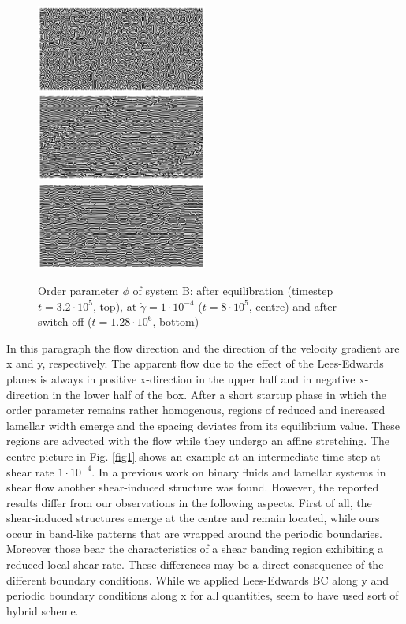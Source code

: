 \documentclass[8.5pt,twoside,twocolumn]{article}
\newcommand{\e}[1]{\cdot10^{#1}}
\begin{document}
\begin{figure}[htp!]
\centering
\includegraphics[angle=0,width=0.5\textwidth]{phi_run707_320.jpg}\\
\includegraphics[angle=0,width=0.5\textwidth]{phi_run710_800.jpg}\\
\includegraphics[angle=0,width=0.5\textwidth]{phi_run765_1280.jpg}
\caption{Order parameter $\phi$ of system B: after equilibration (timestep $t=3.2\e{5}$, top), at $\dot{\gamma}=1\cdot10^{-4}$ ($t=8\e{5}$, centre) and after switch-off ($t=1.28\e{6}$, bottom)}
\label{fig2}
\end{figure}

In this paragraph the flow direction and the direction of the velocity gradient are x and y, respectively.
The apparent flow due to the effect of the Lees-Edwards planes is always in positive x-direction in the upper half and in negative x-direction in the lower half of the box.
After a short startup phase in which the order parameter remains rather homogenous, regions of reduced and increased lamellar width emerge and the spacing deviates from its equilibrium value.
These regions are advected with the flow while they undergo an affine stretching.
The centre picture in Fig. \ref{fig1} shows an example at an intermediate time step at shear rate $1\e{-4}$.
In a previous work on binary fluids and lamellar systems in shear flow \cite{Xu06b} another shear-induced structure was found.
However, the reported results differ from our observations in the following aspects.
First of all, the shear-induced structures emerge at the centre and remain located, while ours occur in band-like patterns that are wrapped around the periodic boundaries.
Moreover those bear the characteristics of a shear banding region exhibiting a reduced local shear rate.
These differences may be a direct consequence of the different boundary conditions.
While we applied Lees-Edwards BC along y and periodic boundary conditions along x for all quantities, \cite{Xu06b} seem to have used sort of hybrid scheme.
\end{document}
